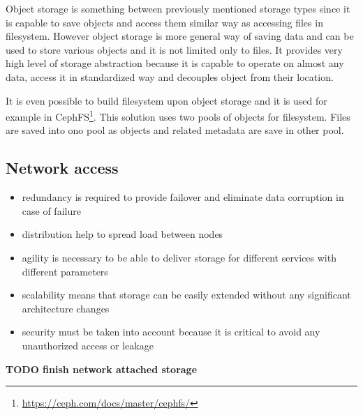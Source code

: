 Object storage is something between previously mentioned storage types since it is capable to save objects and access them similar way as accessing files in filesystem. However object storage is more general way of saving data and can be used to store various objects and it is not limited only to files. It provides very high level of storage abstraction because it is capable to operate on almost any data, access it in standardized way and decouples object from their location.
\label{par:object-storage}

It is even possible to build filesystem upon object storage and it is used for example in CephFS\footnote{\url{https://ceph.com/docs/master/cephfs/}}. This solution uses two pools of objects for  filesystem. Files are saved into ono pool as objects and related metadata are save in other pool. 

\subsection{Network access}
\begin{itemize}
	\item redundancy is required to provide failover and eliminate data corruption in case of failure 
	\item distribution help to spread load between nodes
	\item agility is necessary to be able to deliver storage for different services with different parameters
	\item scalability means that storage can be easily extended without any significant architecture changes
	\item security must be taken into account because it is critical to avoid any unauthorized access or leakage
\end{itemize}

\label{par:storage-network}
% 

\textbf{TODO finish network attached storage}




